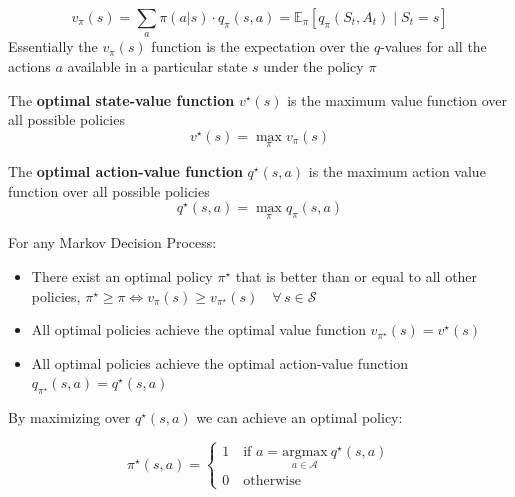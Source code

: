 \[
    v_\pi(s) = \sum_{a} \pi(a \lvert s) \cdot q_\pi(s,a) = \mathbb{E}_\pi[q_\pi(S_t,A_t) \mid S_t = s]
\]
Essentially the $v_\pi(s)$ function is the expectation over the $q$-values for all the actions $a$ available in a particular state $s$ under the policy $\pi$

\begin{definition}
    The \textbf{optimal state-value function} $v^\star(s)$ is the maximum value function over all possible policies
    \[
        v^\star(s) = \max_\pi v_\pi(s)
    \]
\end{definition}

\begin{definition}
    The \textbf{optimal action-value function} $q^\star(s,a)$ is the maximum action value function over all possible policies
    \[
        q^\star(s,a) = \max_\pi q_\pi(s,a)
    \]
\end{definition}

\begin{theorem}
    For any Markov Decision Process:
    \begin{itemize}
        \item There exist an optimal policy $\pi^\star$ that is better than or equal to all other policies, $\pi^\star \geq \pi \iff v_\pi(s) \geq v_{\pi^\star}(s) \quad \forall \, s \in \mathcal{S}$
        \item All optimal policies achieve the optimal value function $v_{\pi^\star}(s) = v^\star(s)$
        \item All optimal policies achieve the optimal action-value function $q_{\pi^\star}(s,a) = q^\star(s,a)$
    \end{itemize}
\end{theorem}
By maximizing over $q^\star(s,a)$ we can achieve an optimal policy:

\begin{equation}
    \pi^\star(s,a) =
    \begin{cases}
        1 \quad \text{if } a = \underset{a \in \mathcal{A}}{\mathrm{argmax}} \ q^\star(s,a) \\
        0 \quad \text{otherwise}
    \end{cases} 
\end{equation}
